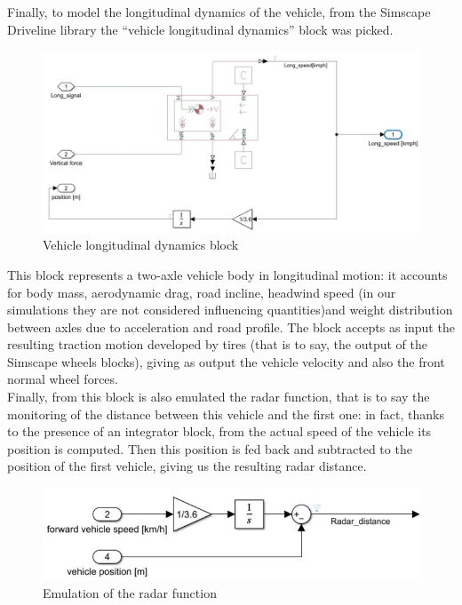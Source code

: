 \documentclass[12pt,a4paper]{report}
\begin{document}
Finally, to model the longitudinal dynamics of the vehicle, from the Simscape Driveline library the “vehicle longitudinal dynamics” block was picked.


\begin{figure}[htbp]
	\centering
	\includegraphics[scale=0.5]{LongitudinalDynamic.jpg}
	\caption{Vehicle longitudinal dynamics block}
\end{figure}

This block represents a two-axle vehicle body in longitudinal motion: it accounts for body mass, aerodynamic drag, road incline, headwind speed (in our simulations they are not considered influencing quantities)and weight distribution between axles due to acceleration and road profile. The block accepts as input the resulting traction motion developed by tires (that is to say, the output of the Simscape wheels blocks), giving as output the vehicle velocity and also the front normal wheel forces.\\
Finally, from this block is also emulated the radar function, that is to say the monitoring of the distance between this vehicle and the first one: in fact, thanks to the presence of an integrator block, from the actual speed of the vehicle its position is computed. Then this position is fed back and subtracted to the position of the first vehicle, giving us the resulting radar distance.

\begin{figure}[htbp]
	\centering
	\includegraphics{RadarFunction.jpg}
	\caption{Emulation of the radar function}
\end{figure}
\end{document}
